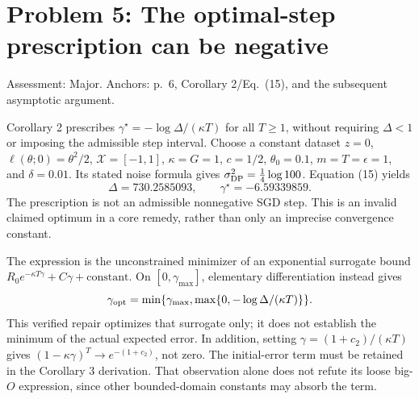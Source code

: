 \documentclass[10pt]{article}
\begin{document}
\section*{Problem 5: The optimal-step prescription can be negative}
Assessment: Major. Anchors: p. 6, Corollary 2/Eq. (15), and the subsequent asymptotic argument.\par
Corollary 2 prescribes \(\gamma^\star=-\log\Delta/(\kappa T)\) for all \(T\ge1\), without requiring \(\Delta<1\) or imposing the admissible step interval. Choose a constant dataset \(z=0\), \(\ell(\theta;0)=\theta^2/2\), \(\mathcal X=[-1,1]\), \(\kappa=G=1\), \(c=1/2\), \(\theta_0=0.1\), \(m=T=\epsilon=1\), and \(\delta=0.01\). Its stated noise formula gives \(\sigma_{\rm DP}^2=\tfrac14\log100\). Equation (15) yields \[\Delta=730.2585093,\qquad \gamma^\star=-6.59339859.\] The prescription is not an admissible nonnegative SGD step. This is an invalid claimed optimum in a core remedy, rather than only an imprecise convergence constant.\par
The expression is the unconstrained minimizer of an exponential surrogate bound \(R_0e^{-\kappa T\gamma}+C\gamma+\text{constant}\). On \([0,\gamma_{\max}]\), elementary differentiation instead gives \[\gamma_{\rm opt}=
 \min\{\gamma_{\max},\max\{0,-\log\Delta/(\kappa T)\}\}.\] This verified repair optimizes that surrogate only; it does not establish the minimum of the actual expected error. In addition, setting \(\gamma=(1+c_2)/(\kappa T)\) gives \((1-\kappa\gamma)^T\to e^{-(1+c_2)}\), not zero. The initial-error term must be retained in the Corollary 3 derivation. That observation alone does not refute its loose big-\(O\) expression, since other bounded-domain constants may absorb the term.\par
\end{document}
